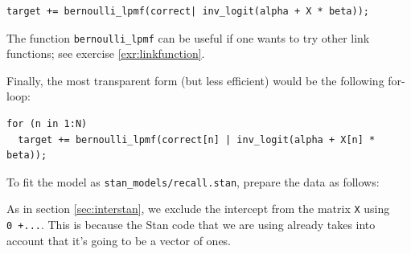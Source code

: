 \documentclass[12pt,]{krantz}
\newenvironment{Shaded}{\begin{snugshade}}{\end{snugshade}}
\newcommand{\DataTypeTok}[1]{\textcolor[rgb]{0.13,0.29,0.53}{#1}}
\newcommand{\DecValTok}[1]{\textcolor[rgb]{0.00,0.00,0.81}{#1}}
\newcommand{\KeywordTok}[1]{\textcolor[rgb]{0.13,0.29,0.53}{\textbf{#1}}}
\newcommand{\NormalTok}[1]{#1}
\newcommand{\OperatorTok}[1]{\textcolor[rgb]{0.81,0.36,0.00}{\textbf{#1}}}
\newcommand{\StringTok}[1]{\textcolor[rgb]{0.31,0.60,0.02}{#1}}
\theoremstyle{definition}
\theoremstyle{definition}
\theoremstyle{definition}
\theoremstyle{remark}
\begin{document}
\begin{verbatim}
target += bernoulli_lpmf(correct| inv_logit(alpha + X * beta));
\end{verbatim}

The function \texttt{bernoulli\_lpmf} can be useful if one wants to try other link functions; see exercise \ref{exr:linkfunction}.

Finally, the most transparent form (but less efficient) would be the following for-loop:

\begin{verbatim}
for (n in 1:N)
  target += bernoulli_lpmf(correct[n] | inv_logit(alpha + X[n] * beta));
\end{verbatim}

To fit the model as \texttt{stan\_models/recall.stan}, prepare the data as follows:

\begin{Shaded}
\end{Shaded}

As in section \ref{sec:interstan}, we exclude the intercept from the matrix \texttt{X} using \texttt{0\ +...}. This is because the Stan code that we are using already takes into account that it's going to be a vector of ones.
\end{document}
